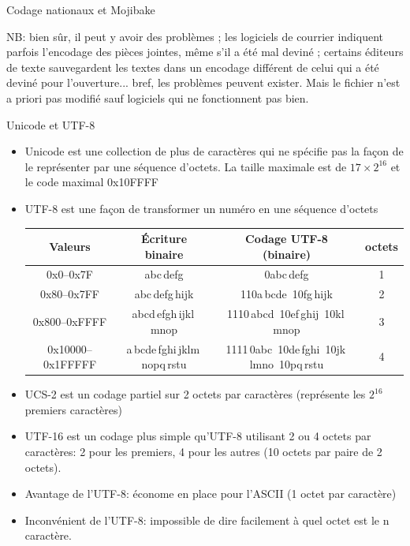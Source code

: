 \begin{exercice}
\begin{exercicelet}{Codage nationaux et Mojibake}
\begin{enumerate}
\begin{xcorrection}
        NB: bien sûr, il peut y avoir des problèmes ; les logiciels de
        courrier indiquent parfois l'encodage des pièces jointes, même s'il
        a été mal deviné ; certains éditeurs de texte sauvegardent les
        textes dans un encodage différent de celui qui a été deviné pour
        l'ouverture... bref, les problèmes peuvent exister. Mais le fichier
        n'est a priori pas modifié sauf logiciels qui ne fonctionnent pas
        bien.
      \end{xcorrection}
    \end{enumerate}
  \end{exercicelet}
\end{exercice}
\begin{frame}{Unicode et UTF-8}
  \begin{itemize}
  \item Unicode est une collection de plus de  caractères qui
    ne spécifie pas la façon de le représenter par une séquence d'octets. La
    taille maximale est de $17\times 2^{16}$ et le code maximal 0x10FFFF
  \item UTF-8 est une façon de transformer un numéro en une séquence d'octets
    \begin{center}\renewcommand{\tabcolsep}{1mm}
      \begin{tabular}{|c|c|c|c|}\hline
        Valeurs & Écriture binaire & Codage UTF-8 (binaire) & octets\\\hline
        0x0--0x7F & abc\,defg & 0abc\,defg & 1 \\
        0x80--0x7FF & abc\,defg\,hijk & 110a\,bcde~10fg\,hijk & 2 \\
        0x800--0xFFFF & abcd\,efgh\,ijkl\,mnop & 1110\,abcd~10ef\,ghij~10kl\,mnop & 3 \\
        0x10000--0x1FFFFF& a\,bcde\,fghi\,jklm\,nopq\,rstu & 1111\,0abc~10de\,fghi~10jk\,lmno~10pq\,rstu &	4 \\\hline
      \end{tabular}
    \end{center}
  \item UCS-2 est un codage partiel sur 2 octets par caractères (représente les $2^{16}$ premiers caractères)
  \item UTF-16 est un codage plus simple qu'UTF-8 utilisant 2 ou 4 octets par
    caractères: 2 pour les premiers, 4 pour les autres (10 octets par paire de
    2 octets).
  \item[\dialoginformation] Avantage de l'UTF-8: économe en place pour l'ASCII (1 octet par caractère)
  \item[\dialogwarning] Inconvénient de l'UTF-8: impossible de dire facilement à quel octet est le n\ieme{} caractère.
  \end{itemize}
\end{frame}
